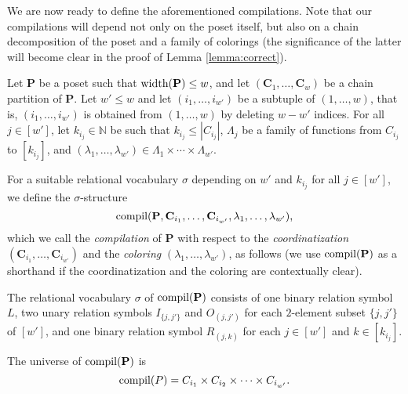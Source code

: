 \documentclass[usletter]{article}
\newcommand{\cc}{\mathbf{C}}
\newcommand{\pp}{\mathbf{P}}
\begin{document}
We are now ready to define the aforementioned compilations.  
Note that our compilations will depend not only on the poset itself, 
but also on a chain decomposition of the poset and a family of colorings 
(the significance of the latter will become clear in the proof of Lemma \ref{lemma:correct}).  




Let $\pp$ be a 
poset such that $\textup{width}(\pp)\leq w$, 
and let $(\cc_1,\ldots,\cc_{w})$ be a chain partition of $\pp$.  
Let $w' \leq w$ and let $(i_1,\ldots,i_{w'})$ be a subtuple of $(1,\ldots,w)$, 
that is, $(i_1,\ldots,i_{w'})$ is obtained from $(1,\ldots,w)$ by deleting $w-w'$ indices.  
For all $j \in [w']$, let $k_{i_j} \in \mathbb{N}$ be such that $k_{i_j} \leq |C_{i_j}|$, 
$\Lambda_j$ be a family of functions from $C_{i_j}$ to $[k_{i_j}]$, 
and $(\lambda_1,\ldots,\lambda_{w'}) \in \Lambda_1 \times \cdots \times \Lambda_{w'}$.  

For a suitable relational vocabulary $\sigma$ depending on $w'$ and $k_{i_j}$ for all $j \in [w']$, 
we define the $\sigma$-structure $$\textup{compil}(\pp,\cc_{i_1},\ldots,\cc_{i_{w'}},\lambda_1,\ldots,\lambda_{w'})\text{,}$$
which we call the \emph{compilation} of $\pp$ with respect to the \emph{coordinatization} $(\cc_{i_1},\ldots,\cc_{i_{w'}})$ 
and the \emph{coloring} $(\lambda_1,\ldots,\lambda_{w'})$, as follows 
(we use $\textup{compil}(\pp)$ as a shorthand
if the coordinatization and the coloring are contextually clear).



The relational vocabulary $\sigma$ of $\textup{compil}(\mathbf{P})$ 
consists of one binary relation symbol $L$, 
two unary relation symbols $I_{\{j,j'\}}$ and $O_{(j,j')}$ 
for each $2$-element subset $\{j,j'\}$ of $[w']$, 
and one binary relation symbol $R_{(j,k)}$ 
for each $j \in [w']$ and $k \in [k_{i_j}]$.  

The universe of $\textup{compil}(\mathbf{P})$ is 
$$\textup{compil}(P)=C_{i_1} \times C_{i_2} \times \cdots \times C_{i_{w'}}\text{.}$$
\end{document}
